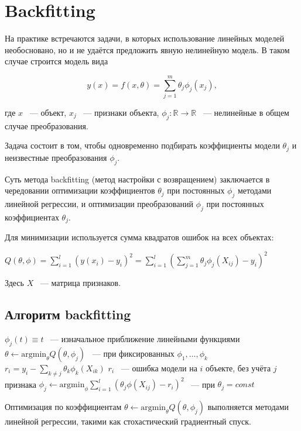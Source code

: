 \section{Backfitting}

На практике встречаются задачи, в которых использование линейных моделей необосновано, но и не удаётся предложить явную нелинейную модель. В таком случае строится модель вида

$$\displaystyle y(x)=f(x,\theta)=\sum_{j=1}^m\theta_j \phi_j(x_j),$$

где $x$ ~--- объект, $x_j$ ~--- признаки объекта, $\phi_j:\mathbb{R}\rightarrow \mathbb{R}$ ~--- нелинейные в общем случае преобразования.

Задача состоит в том, чтобы одновременно подбирать коэффициенты модели $\theta_j$ и неизвестные преобразования $\phi_j$.

Суть метода backfitting (метод настройки с возвращением) заключается в чередовании оптимизации коэффициентов $\theta_j$ при постоянных $\phi_j$ методами линейной регрессии, и оптимизации преобразований $\phi_j$ при постоянных коэффициентах $\theta_j$. 

Для минимизации используется сумма квадратов ошибок на всех объектах:

$Q(\theta, \phi) = \displaystyle \sum_{i=1}^l \left( y(x_i) - y_i \right)^2 = \sum_{i=1}^l \left( \sum_{j=1}^m \theta_j \phi_j(X_{ij}) - y_i \right)^2 $

Здесь $X$ ~--- матрица признаков.

\subsection{Алгоритм backfitting}
\begin{algorithmic}
\State $\phi_j(t) \equiv t$ ~--- изначальное приближение линейными функциями
    \State $\theta \gets \text{argmin}_{\theta}Q(\theta, \phi_j)$ ~--- при фиксированных $\phi_1,\dots, \phi_k$
        \State $\displaystyle r_i = y_i - \sum_{k\neq j} \theta_k \phi_k(X_{ik})$
        \State $r_i$ ~--- ошибка модели на $i$ объекте, без учёта $j$ признака
        \State $\displaystyle\phi_j \gets \text{argmin}_{\phi} \sum_{i=1}^l \left( \theta_j \phi(X_{ij}) - r_i \right)^2$ ~--- при $\theta_j=const$
    \EndFor
\EndWhile 
\end{algorithmic}

Оптимизация по коэффициентам $\theta \gets \text{argmin}_{\theta}Q(\theta, \phi_j)$ выполняется методами линейной регрессии, такими как стохастический градиентный спуск.

